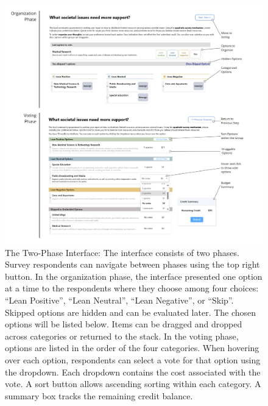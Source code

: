 \begin{figure}[ht]
    \centering
    \includegraphics[width=1\textwidth]{content/image/detailed.pdf}
    \caption{The Two-Phase Interface: The interface consists of two phases. Survey respondents can navigate between phases using the top right button. In the organization phase, the interface presented one option at a time to the respondents where they choose among four choices: ``Lean Positive'', ``Lean Neutral'', ``Lean Negative'', or ``Skip''. Skipped options are hidden and can be evaluated later. The chosen options will be listed below. Items can be dragged and dropped across categories or returned to the stack. In the voting phase, options are listed in the order of the four categories. When hovering over each option, respondents can select a vote for that option using the dropdown. Each dropdown contains the cost associated with the vote. A sort button allows ascending sorting within each category. A summary box tracks the remaining credit balance.}
    \label{fig:interactiveInterface}
\end{figure}

